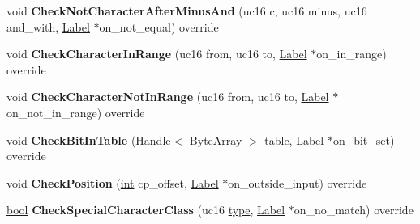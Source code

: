 \begin{DoxyCompactItemize}
void {\bfseries Check\+Not\+Character\+After\+Minus\+And} (uc16 c, uc16 minus, uc16 and\+\_\+with, \mbox{\hyperlink{classv8_1_1internal_1_1Label}{Label}} $\ast$on\+\_\+not\+\_\+equal) override
\item 
\mbox{\label{classv8_1_1internal_1_1RegExpMacroAssemblerTracer_a39cdc5aa844164b26297cb27e537bd83}} 
void {\bfseries Check\+Character\+In\+Range} (uc16 from, uc16 to, \mbox{\hyperlink{classv8_1_1internal_1_1Label}{Label}} $\ast$on\+\_\+in\+\_\+range) override
\item 
\mbox{\label{classv8_1_1internal_1_1RegExpMacroAssemblerTracer_ab1f1c365495d56275abb483477b0e84d}} 
void {\bfseries Check\+Character\+Not\+In\+Range} (uc16 from, uc16 to, \mbox{\hyperlink{classv8_1_1internal_1_1Label}{Label}} $\ast$on\+\_\+not\+\_\+in\+\_\+range) override
\item 
\mbox{\label{classv8_1_1internal_1_1RegExpMacroAssemblerTracer_ac1f7b38355f449a4c0afc7193f584eee}} 
void {\bfseries Check\+Bit\+In\+Table} (\mbox{\hyperlink{classv8_1_1internal_1_1Handle}{Handle}}$<$ \mbox{\hyperlink{classv8_1_1internal_1_1ByteArray}{Byte\+Array}} $>$ table, \mbox{\hyperlink{classv8_1_1internal_1_1Label}{Label}} $\ast$on\+\_\+bit\+\_\+set) override
\item 
\mbox{\label{classv8_1_1internal_1_1RegExpMacroAssemblerTracer_a386626454d05eb77493ee827b17cecda}} 
void {\bfseries Check\+Position} (\mbox{\hyperlink{classint}{int}} cp\+\_\+offset, \mbox{\hyperlink{classv8_1_1internal_1_1Label}{Label}} $\ast$on\+\_\+outside\+\_\+input) override
\item 
\mbox{\label{classv8_1_1internal_1_1RegExpMacroAssemblerTracer_a6107d9a93c789dc9ac79c854cb22ccb6}} 
\mbox{\hyperlink{classbool}{bool}} {\bfseries Check\+Special\+Character\+Class} (uc16 \mbox{\hyperlink{classstd_1_1conditional_1_1type}{type}}, \mbox{\hyperlink{classv8_1_1internal_1_1Label}{Label}} $\ast$on\+\_\+no\+\_\+match) override
\item 
\mbox{\label{classv8_1_1internal_1_1RegExpMacroAssemblerTracer_a35356e0a474db1ef6434bd01ad023140}} 

\end{DoxyCompactItemize}
